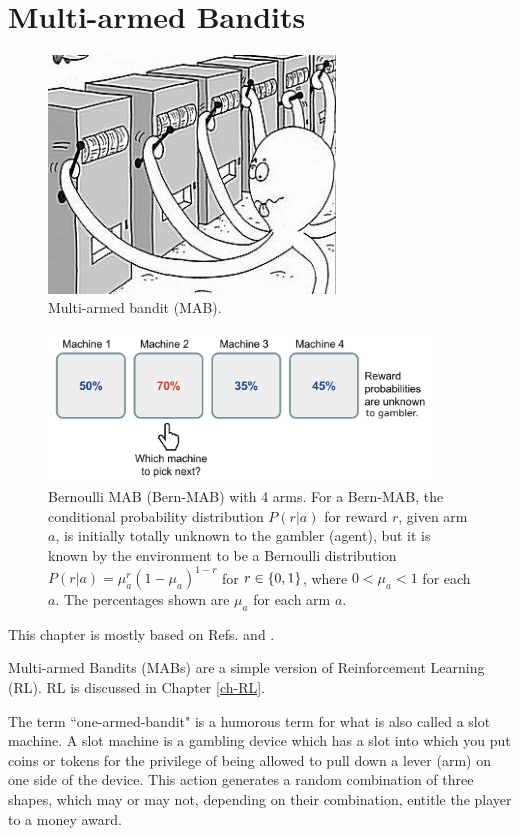\chapter{Multi-armed Bandits}\label{ch-multi-armed}


\begin{figure}[h!]
\centering
\includegraphics[width=3in]
{multi-armed/octupus-bandit.png}
\caption{Multi-armed bandit (MAB).
} 
\label{fig-octupus-bandit}
\end{figure}

\begin{figure}[h!]
\centering
\includegraphics[width=4in]
{multi-armed/bern_bandit.png}
\caption{Bernoulli MAB (Bern-MAB)
with 4 arms. For a Bern-MAB, the 
conditional probability 
distribution $P(r|a)$ for reward $r$,
given  
arm $a$,
is initially totally unknown to the gambler (agent), 
but it is known by the environment to be
a Bernoulli distribution $P(r|a) = \mu_a^r(1-\mu_a)^{1-r}$
for $r\in \{0,1\}$, where $0<\mu_a<1$ for each $a$.
The percentages shown are $\mu_a$ for each arm $a$. }
\label{fig-bern-bandit}
\end{figure}

This chapter
is mostly based on Refs.
\cite{book-ashwin-rao} and \cite{weng2018bandit}.

Multi-armed Bandits (MABs) are a simple
version  of 
Reinforcement Learning (RL). RL is discussed 
in Chapter \ref{ch-RL}.

The term ``one-armed-bandit"
is a humorous term 
for what is also called
a slot machine.
A slot machine is a gambling device
which has a slot into which
you put coins or tokens
for the privilege of being allowed to  pull down 
a lever (arm) on one side of the device.
This action generates 
a random combination of three shapes, 
which may or may not, depending on their combination,
entitle the player to a 
 money award.

